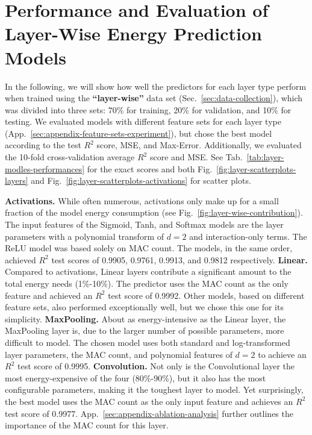 
\section{Performance and Evaluation of Layer-Wise Energy Prediction Models}
\label{sec:results}

In the following, we will show how well the predictors for each layer type perform when trained using the \textbf{``layer-wise''} data set (Sec.~\ref{sec:data-collection}), which was divided into three sets: 70\% for training, 20\% for validation, and 10\% for testing. We evaluated models with different feature sets for each layer type (App.~\ref{sec:appendix-feature-sets-experiment}), but chose the best model according to the test $R^2$ score, MSE, and Max-Error. Additionally, we evaluated the 10-fold cross-validation average $R^2$ score and MSE. See Tab.~\ref{tab:layer-modles-performances} for the exact scores and both Fig.~\ref{fig:layer-scatterplots-layers} and Fig.~\ref{fig:layer-scatterplots-activations} for scatter plots.

\textbf{Activations.} While often numerous, activations only make up for a small fraction of the model energy consumption (see Fig.~\ref{fig:layer-wise-contribution}). The input features of the Sigmoid, Tanh, and Softmax models are the layer parameters with a polynomial transform of $d=2$ and interaction-only terms. The ReLU model was based solely on MAC count. The models, in the same order, achieved $R^2$ test scores of  0.9905, 0.9761, 0.9913, and 0.9812 respectively. \textbf{Linear.} Compared to activations, Linear layers contribute a significant amount to the total energy needs (1\%-10\%). The predictor uses the MAC count as the only feature and achieved an $R^2$ test score of 0.9992. Other models, based on different feature sets, also performed exceptionally well, but we chose this one for its simplicity. \textbf{MaxPooling.} About as energy-intensive as the Linear layer, the MaxPooling layer is, due to the larger number of possible parameters, more difficult to model. The chosen model uses both standard and log-transformed layer parameters, the MAC count, and polynomial features of $d=2$ to achieve an $R^2$ test score of 0.9995. \textbf{Convolution.} Not only is the Convolutional layer the most energy-expensive of the four (80\%-90\%), but it also has the most configurable parameters, making it the toughest layer to model. Yet surprisingly, the best model uses the MAC count as the only input feature and achieves an $R^2$ test score of 0.9977. App.~\ref{sec:appendix-ablation-analysis} further outlines the importance of the MAC count for this layer.

